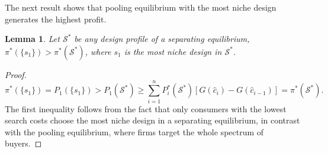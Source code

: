 \documentclass[14pt]{article}
\theoremstyle{plain}
\newtheorem{lemma}[thm]{Lemma}
\theoremstyle{definition}
\theoremstyle{remark}
\DeclareRobustCommand\1{\futurelet\oneNext\oneCheck}
\renewcommand{\S}{\mathcal{S}}
\begin{document}
 The next result shows that pooling equilibrium with the most niche design generates the highest profit. 
\begin{lemma}\label{lemma:eq_refinement_payoff}
Let $\S^*$ be any design profile of a separating equilibrium,  $\pi^*(\{s_1\})>\pi^*(\S^*)$, where $s_1$ is the most niche design in $\S^*$.
\end{lemma}
\begin{proof}
\[\pi^*(\{s_1\})=P_1(\{s_1\})>P_1(\S^*)\geq\sum_{i=1}^n P_i^*(\S^*)[G(\hat{c}_i)-G(\hat{c}_{i-1})]=\pi^*(\S^*).\]
The first inequality follows from the fact that only consumers with the lowest search costs choose the most niche design in a separating equilibrium, in contrast with the pooling equilibrium, where firms target the whole spectrum of buyers.
\end{proof}












 
\end{document}
